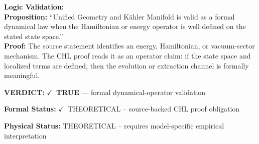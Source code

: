 \textbf{Logic Validation:}\\
\textbf{Proposition:} ``Unified Geometry and Kähler Manifold is valid as a formal dynamical law when the
Hamiltonian or energy operator is well defined on the stated state space.''\\
\textbf{Proof:} The source statement identifies an energy, Hamiltonian, or vacuum-sector mechanism. The
CHL proof reads it as an operator claim: if the state space and localized terms are
defined, then the evolution or extraction channel is formally meaningful.

\textbf{VERDICT:} \ensuremath{\checkmark}\ \textbf{TRUE} --- formal dynamical-operator validation

\textbf{Formal Status:} \ensuremath{\checkmark}\ THEORETICAL -- source-backed CHL proof obligation

\textbf{Physical Status:} THEORETICAL -- requires model-specific empirical interpretation
\par\vspace{0.45em}
\par
\ifTZPDarkEdition
{}
\fi
\endgroup
\endgroup
